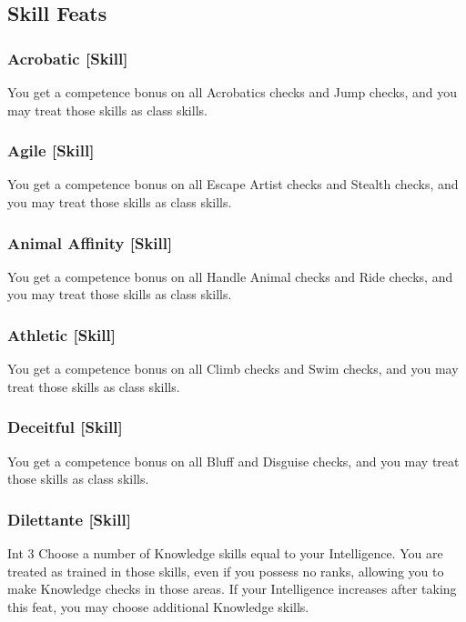 \subsection{Skill Feats}

\subsubsection{Acrobatic [Skill]}
 You get a  competence bonus on all Acrobatics checks and Jump checks, and you may treat those skills as class skills.

\subsubsection{Agile [Skill]}
 You get a  competence bonus on all Escape Artist checks and Stealth checks, and you may treat those skills as class skills.

\subsubsection{Animal Affinity [Skill]}
 You get a  competence bonus on all Handle Animal checks and Ride checks, and you may treat those skills as class skills.

\subsubsection{Athletic [Skill]}
 You get a  competence bonus on all Climb checks and Swim checks, and you may treat those skills as class skills.

\subsubsection{Deceitful [Skill]}
 You get a  competence bonus on all Bluff and Disguise checks, and you may treat those skills as class skills.

\subsubsection{Dilettante [Skill]}
 Int 3
 Choose a number of Knowledge skills equal to your Intelligence. You are treated as trained in those skills, even if you possess no ranks, allowing you to make Knowledge checks in those areas. If your Intelligence increases after taking this feat, you may choose additional Knowledge skills.

